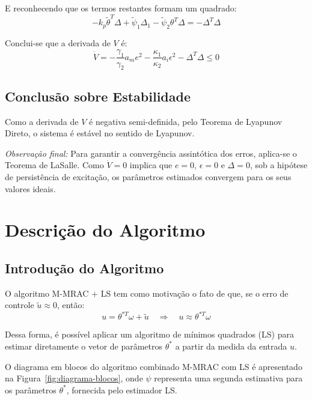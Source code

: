 \documentclass[10pt]{article}
\begin{document}
E reconhecendo que os termos restantes formam um quadrado:
\begin{equation}
- k_p \tilde{\theta}^T \Delta + \tilde{\psi}_1 \Delta_1 - \tilde{\psi}_2 \theta^T \Delta = - \Delta^T \Delta
\end{equation}

Conclui-se que a derivada de $V$ é:
\begin{equation}
\dot{V} = -\frac{\gamma_1}{\gamma_2} a_m e^2 - \frac{\kappa_1}{\kappa_2} a_i \epsilon^2 - \Delta^T \Delta \leq 0
\end{equation}

\subsection{Conclusão sobre Estabilidade}

Como a derivada de $V$ é negativa semi-definida, pelo Teorema de Lyapunov Direto, o sistema é estável no sentido de Lyapunov.

\bigskip

\textit{Observação final:} Para garantir a convergência assintótica dos erros, aplica-se o Teorema de LaSalle. Como $\dot{V} = 0$ implica que $e = 0$, $\epsilon = 0$ e $\Delta = 0$, sob a hipótese de persistência de excitação, os parâmetros estimados convergem para os seus valores ideais.

\section{Descrição do Algoritmo}

\subsection{Introdução do Algoritmo}

O algoritmo M-MRAC + LS tem como motivação o fato de que, se o erro de controle \( \tilde{u} \approx 0 \), então:
\begin{equation}
    u = \theta^{*T}\omega + \tilde{u} \quad \Rightarrow \quad u \approx \theta^{*T}\omega
\end{equation}

Dessa forma, é possível aplicar um algoritmo de mínimos quadrados (LS) para estimar diretamente o vetor de parâmetros \(\theta^*\) a partir da medida da entrada \(u\).

O diagrama em blocos do algoritmo combinado M-MRAC com LS é apresentado na Figura~\ref{fig:diagrama-blocos}, onde \(\psi\) representa uma segunda estimativa para os parâmetros \(\theta^*\), fornecida pelo estimador LS.
\end{document}
